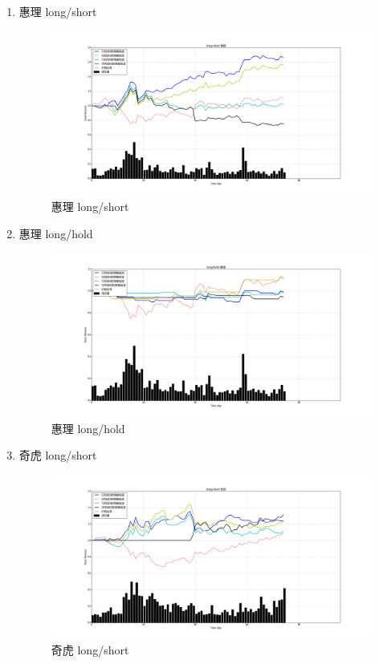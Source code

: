 \documentclass[12pt,a4paper]{article}
\begin{document}
\begin{enumerate}[1.]
\item 惠理 long/short


\begin{figure}[H]
	\centering
	\includegraphics[width=1.0\textwidth]{img_r_1/short/hl.png}
	\caption{惠理 long/short}
\end{figure}

\item 惠理 long/hold

\begin{figure}[H]
	\centering
	\includegraphics[width=1.0\textwidth]{img_r_1/hold/hl.png}
	\caption{惠理 long/hold}
\end{figure}

\item 奇虎 long/short


\begin{figure}[H]
	\centering
	\includegraphics[width=1.0\textwidth]{img_r_1/short/qihu.png}
	\caption{奇虎 long/short}
\end{figure}


\end{enumerate}
\end{document}
